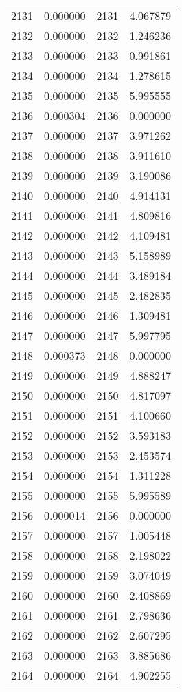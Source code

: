 \documentclass[12pt]{article}
\begin{document}
\begin{longtable}{@{}cccc@{}}
2131 & 0.000000 & 2131 & 4.067879 \\
2132 & 0.000000 & 2132 & 1.246236 \\
2133 & 0.000000 & 2133 & 0.991861 \\
2134 & 0.000000 & 2134 & 1.278615 \\
2135 & 0.000000 & 2135 & 5.995555 \\
2136 & 0.000304 & 2136 & 0.000000 \\
2137 & 0.000000 & 2137 & 3.971262 \\
2138 & 0.000000 & 2138 & 3.911610 \\
2139 & 0.000000 & 2139 & 3.190086 \\
2140 & 0.000000 & 2140 & 4.914131 \\
2141 & 0.000000 & 2141 & 4.809816 \\
2142 & 0.000000 & 2142 & 4.109481 \\
2143 & 0.000000 & 2143 & 5.158989 \\
2144 & 0.000000 & 2144 & 3.489184 \\
2145 & 0.000000 & 2145 & 2.482835 \\
2146 & 0.000000 & 2146 & 1.309481 \\
2147 & 0.000000 & 2147 & 5.997795 \\
2148 & 0.000373 & 2148 & 0.000000 \\
2149 & 0.000000 & 2149 & 4.888247 \\
2150 & 0.000000 & 2150 & 4.817097 \\
2151 & 0.000000 & 2151 & 4.100660 \\
2152 & 0.000000 & 2152 & 3.593183 \\
2153 & 0.000000 & 2153 & 2.453574 \\
2154 & 0.000000 & 2154 & 1.311228 \\
2155 & 0.000000 & 2155 & 5.995589 \\
2156 & 0.000014 & 2156 & 0.000000 \\
2157 & 0.000000 & 2157 & 1.005448 \\
2158 & 0.000000 & 2158 & 2.198022 \\
2159 & 0.000000 & 2159 & 3.074049 \\
2160 & 0.000000 & 2160 & 2.408869 \\
2161 & 0.000000 & 2161 & 2.798636 \\
2162 & 0.000000 & 2162 & 2.607295 \\
2163 & 0.000000 & 2163 & 3.885686 \\
2164 & 0.000000 & 2164 & 4.902255 \\

\end{longtable}
\end{document}
